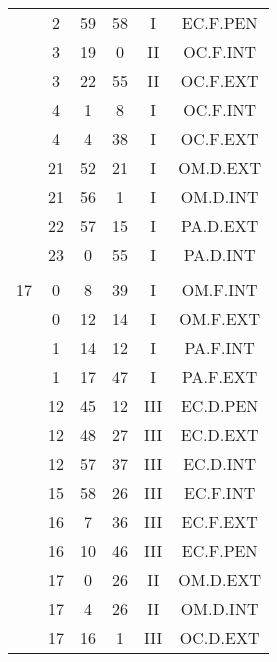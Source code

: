 \documentclass[12pt, a4paper]{article}
\begin{document}
\begin{multicols}{3}
{\begin{tabular}{c c c c c c}
	 	 	 	 & 2 & 59 & 58 & I & EC.F.PEN\\%
	 	 	 	 & 3 & 19 & 0 & II & OC.F.INT\\%
	 	 	 	 & 3 & 22 & 55 & II & OC.F.EXT\\%
	 	 	 	 & 4 & 1 & 8 & I & OC.F.INT\\%
	 	 	 	 & 4 & 4 & 38 & I & OC.F.EXT\\%
	 	 	 	 & 21 & 52 & 21 & I & OM.D.EXT\\%
	 	 	 	 & 21 & 56 & 1 & I & OM.D.INT\\%
	 	 	 	 & 22 & 57 & 15 & I & PA.D.EXT\\%
	 	 	 	 & 23 & 0 & 55 & I & PA.D.INT\\%
	 	 	 	 & & & & & \\%
	 	 	 	17 & 0 & 8 & 39 & I & OM.F.INT\\%
	 	 	 	 & 0 & 12 & 14 & I & OM.F.EXT\\%
	 	 	 	 & 1 & 14 & 12 & I & PA.F.INT\\%
	 	 	 	 & 1 & 17 & 47 & I & PA.F.EXT\\%
	 	 	 	 & 12 & 45 & 12 & III & EC.D.PEN\\%
	 	 	 	 & 12 & 48 & 27 & III & EC.D.EXT\\%
	 	 	 	 & 12 & 57 & 37 & III & EC.D.INT\\%
	 	 	 	 & 15 & 58 & 26 & III & EC.F.INT\\%
	 	 	 	 & 16 & 7 & 36 & III & EC.F.EXT\\%
	 	 	 	 & 16 & 10 & 46 & III & EC.F.PEN\\%
	 	 	 	 & 17 & 0 & 26 & II & OM.D.EXT\\%
	 	 	 	 & 17 & 4 & 26 & II & OM.D.INT\\%
	 	 	 	 & 17 & 16 & 1 & III & OC.D.EXT\\%

\end{tabular}}
\end{multicols}
\end{document}
